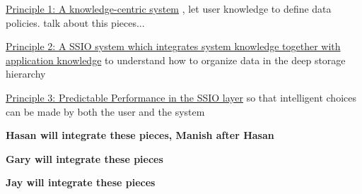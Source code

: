 \underline{Principle 1: A knowledge-centric system} , let user knowledge  to define data policies. talk about this pieces...

\underline{Principle 2: A SSIO system which integrates system knowledge together with application knowledge} to understand
how to organize data in the deep storage hierarchy

\underline{Principle 3: Predictable Performance in the SSIO layer} so that intelligent choices can be made by both the user and the system



%

%


%
{\bf {\color{red}Hasan will integrate these pieces, Manish after Hasan}}




%
%


{\bf {\color{red}Gary will integrate these pieces}}


%
{\bf {\color{red}Jay  will integrate these pieces}}

% 




